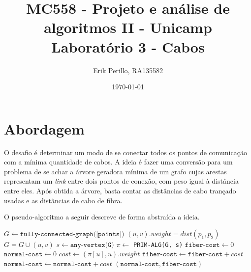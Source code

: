\documentclass[7pt]{article}
\newcommand{\tit}[1]{\textit{#1}}
\newcommand{\ttt}[1]{\texttt{#1}}
\begin{document}

\author{Erik Perillo, RA135582}
\date{\today}
\title{%
	{\small MC558 - Projeto e análise de algoritmos II - Unicamp}\\
	{\Large Laboratório 3 - Cabos}}
\maketitle\vspace{-0.5cm}
\posttitle{\par\end{center}}

\makeatletter
\def\BState{\State\hskip-\ALG@thistlm}
\makeatother


\section{Abordagem}
O desafio é determinar um modo de se conectar todos os pontos de comunicação
com a mínima quantidade de cabos.
A ideia é fazer uma conversão para um problema de se achar a árvore geradora
mínima de um grafo cujas arestas representam um \tit{link} entre dois pontos
de conexão, com peso igual à distância entre eles.
Após obtida a árvore, basta contar as distâncias de cabo trançado usadas
e as distâncias de cabo de fibra.

O pseudo-algoritmo a seguir descreve de forma abstraída a ideia.
\begin{algorithm}
\caption{}\label{Cabos}
\begin{algorithmic}[1]
    \State $G \gets \ttt{fully-connected-graph(|points|)}$
        \State $(u, v).weight = dist(p_1, p_2)$
        \State $G = G \cup (u, v)$
	\EndFor
    \State $s \gets \ttt{any-vertex(G)}$
    \State $\pi \gets$ \ttt{PRIM-ALG(G, s)}
    \State $\ttt{fiber-cost} \gets 0$
    \State $\ttt{normal-cost} \gets 0$
        \State $cost \gets (\pi[u], u).weight$
        \If{$cost > \ttt{fiber-thresh}$}
            \State $\ttt{fiber-cost} \gets \ttt{fiber-cost} + cost$
        \Else
            \State $\ttt{normal-cost} \gets \ttt{normal-cost} + cost$
        \EndIf
	\EndFor
    \Return $(\ttt{normal-cost}, \ttt{fiber-cost})$
    \EndProcedure
\end{algorithmic}
\end{algorithm}
\end{document}
